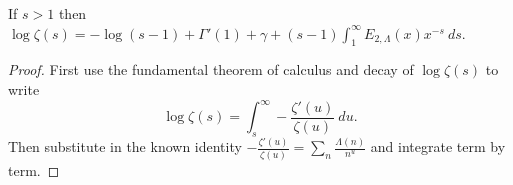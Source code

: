 \begin{sublemma}
\label{log-zeta-eq-1}
\leanok
If $s > 1$ then $\log\zeta(s) = - \log (s-1) + \Gamma'(1) + \gamma + (s-1) \int_1^\infty E_{2,\Lambda}(x) x^{-s}\ ds$.
\end{sublemma}
\begin{proof}
\leanok
First use the fundamental theorem of calculus and decay of $\log \zeta(s)$ to write
  $$ \log \zeta(s) = \int_s^\infty -\frac{\zeta'(u)}{\zeta(u)}\ du.$$
  Then substitute in the known identity
  $-\frac{\zeta'(u)}{\zeta(u)} = \sum_n \frac{\Lambda(n)}{n^u}$ and integrate term by term.
\end{proof}
